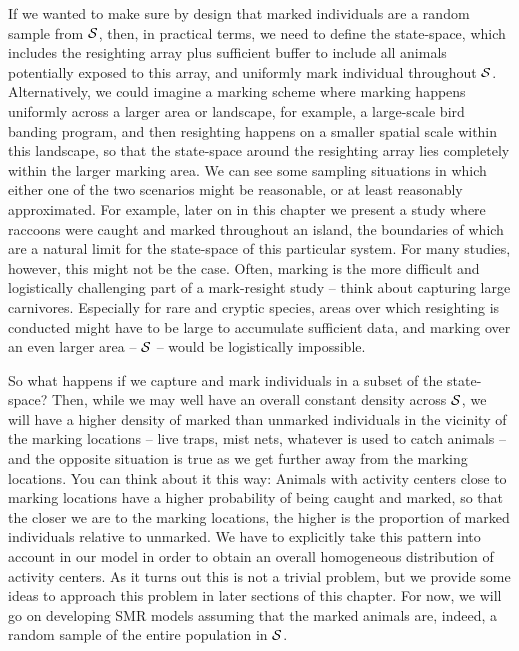 If we wanted to make sure by design that marked individuals are a random sample from ${\cal S}$, then, in practical terms, we need to define the state-space, which includes the resighting array plus sufficient buffer to include all animals potentially exposed to this array, and uniformly mark individual throughout ${\cal S}$. Alternatively, we could imagine a marking scheme where marking happens uniformly across a larger area or landscape, for example, a large-scale bird banding program, and then resighting happens on a smaller spatial scale within this landscape, so that the state-space around the resighting array lies completely within the larger marking area. %
We can see some sampling situations in which either one of the two scenarios might be reasonable, or at least reasonably approximated. For example, later on in this chapter we present a study where raccoons were caught and marked throughout an island, the boundaries of which are a natural limit for the state-space of this particular system. For many studies, however, this might not be the case. Often, marking is the more difficult and logistically challenging part of a mark-resight study -- think about capturing large carnivores. Especially for rare and cryptic species, areas over which resighting is conducted might have to be large to accumulate sufficient data, and marking over an even larger area -- ${\cal S}$ -- would be logistically impossible.

So what happens if we capture and mark individuals in a subset of the state-space? Then, while we may well have an overall constant density across ${\cal S}$, we will have a higher density of marked than unmarked individuals in the vicinity of the marking locations -- live traps, mist nets, whatever is used to catch animals -- and the opposite situation is true as we get further away from the marking locations. You can think about it this way: Animals with activity centers close to marking locations have a higher probability of being caught and marked, so that the closer we are to the marking locations, the higher is the proportion of marked individuals relative to unmarked. We have to explicitly take this pattern into account in our model in order to obtain an overall homogeneous distribution of activity centers.
As it turns out this is not a trivial problem, but we provide some ideas to approach this problem in later sections of this chapter. For now, we will go on developing SMR models assuming that the marked animals are, indeed, a random sample of the entire population in ${\cal S}$. %


